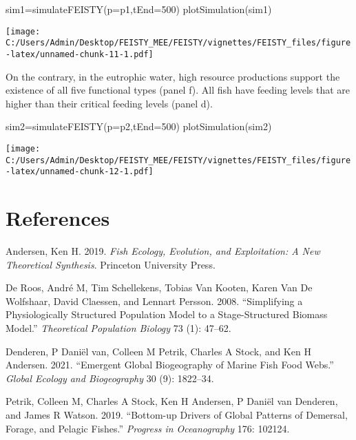 \documentclass[
]{article}
\newenvironment{Shaded}{\begin{snugshade}}{\end{snugshade}}
\newcommand{\AttributeTok}[1]{\textcolor[rgb]{0.77,0.63,0.00}{#1}}
\newcommand{\DecValTok}[1]{\textcolor[rgb]{0.00,0.00,0.81}{#1}}
\newcommand{\FunctionTok}[1]{\textcolor[rgb]{0.00,0.00,0.00}{#1}}
\newcommand{\NormalTok}[1]{#1}
\newcommand{\OtherTok}[1]{\textcolor[rgb]{0.56,0.35,0.01}{#1}}
\newlength{\cslhangindent}
\newlength{\cslentryspacingunit} %
\newenvironment{CSLReferences}[2] %
 {%
  \setlength{\parindent}{0pt}
  \ifodd #1
  \let\oldpar\par
  \def\par{\hangindent=\cslhangindent\oldpar}
  \fi
  \setlength{\parskip}{#2\cslentryspacingunit}
 }%
 {}
\begin{document}
\begin{Shaded}
\begin{Highlighting}[]
\NormalTok{sim1}\OtherTok{=}\FunctionTok{simulateFEISTY}\NormalTok{(}\AttributeTok{p=}\NormalTok{p1,}\AttributeTok{tEnd=}\DecValTok{500}\NormalTok{)}
\FunctionTok{plotSimulation}\NormalTok{(sim1)}
\end{Highlighting}
\end{Shaded}

\texttt{[image: C:/Users/Admin/Desktop/FEISTY\_MEE/FEISTY/vignettes/FEISTY\_files/figure-latex/unnamed-chunk-11-1.pdf]}

On the contrary, in the eutrophic water, high resource productions
support the existence of all five functional types (panel f). All fish
have feeding levels that are higher than their critical feeding levels
(panel d).

\begin{Shaded}
\begin{Highlighting}[]
\NormalTok{sim2}\OtherTok{=}\FunctionTok{simulateFEISTY}\NormalTok{(}\AttributeTok{p=}\NormalTok{p2,}\AttributeTok{tEnd=}\DecValTok{500}\NormalTok{)}
\FunctionTok{plotSimulation}\NormalTok{(sim2)}
\end{Highlighting}
\end{Shaded}

\texttt{[image: C:/Users/Admin/Desktop/FEISTY\_MEE/FEISTY/vignettes/FEISTY\_files/figure-latex/unnamed-chunk-12-1.pdf]}

\newpage

\hypertarget{references}{%
\section{References}\label{references}}



\hypertarget{refs}{}
\begin{CSLReferences}{1}{0}
\leavevmode{}%
Andersen, Ken H. 2019. \emph{Fish Ecology, Evolution, and Exploitation:
A New Theoretical Synthesis}. Princeton University Press.

\leavevmode{}%
De Roos, André M, Tim Schellekens, Tobias Van Kooten, Karen Van De
Wolfshaar, David Claessen, and Lennart Persson. 2008. {``Simplifying a
Physiologically Structured Population Model to a Stage-Structured
Biomass Model.''} \emph{Theoretical Population Biology} 73 (1): 47--62.

\leavevmode{}%
Denderen, P Daniël van, Colleen M Petrik, Charles A Stock, and Ken H
Andersen. 2021. {``Emergent Global Biogeography of Marine Fish Food
Webs.''} \emph{Global Ecology and Biogeography} 30 (9): 1822--34.

\leavevmode{}%
Petrik, Colleen M, Charles A Stock, Ken H Andersen, P Daniël van
Denderen, and James R Watson. 2019. {``Bottom-up Drivers of Global
Patterns of Demersal, Forage, and Pelagic Fishes.''} \emph{Progress in
Oceanography} 176: 102124.

\end{CSLReferences}
\end{document}
